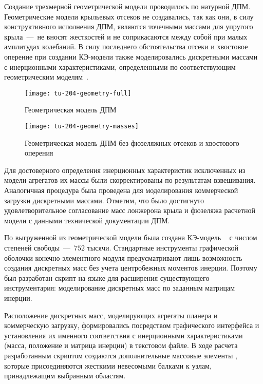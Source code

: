 Создание трехмерной геометрической модели  проводилось по натурной ДПМ. Геометрические модели крыльевых отсеков не создавались, так как они, в силу конструктивного исполнения ДПМ, являются точечными массами для упругого крыла~---~не вносят жесткостей и не соприкасаются между собой при малых амплитудах колебаний. В силу последнего обстоятельства отсеки и хвостовое оперение при создании КЭ-модели также моделировались дискретными массами с инерционными характеристиками, определенными по соответствующим геометрическим моделям~. 

\begin{figure}[!htb]
	\centerfloat
	\texttt{[image: tu-204-geometry-full]}
	\caption{Геометрическая модель ДПМ} \label{fig:tu-204-geometry-full}
\end{figure}

\begin{figure}[!htb]
	\centerfloat
	\texttt{[image: tu-204-geometry-masses]}
	\caption{Геометрическая модель ДПМ без фюзеляжных отсеков и хвостового оперения} \label{fig:tu-204-geometry-masses}
\end{figure}

Для достоверного определения инерционных характеристик исключенных из модели агрегатов их массы были скорректированы по результатам взвешивания. Аналогичная процедура была проведена для моделирования коммерческой загрузки дискретными массами. Отметим, что было достигнуто удовлетворительное согласование масс лонжерона крыла и фюзеляжа расчетной модели с данными технической документации ДПМ.

По выгруженной из  геометрической модели была создана КЭ-модель ~ с числом степеней свободы~---~$ 752 $ тысячи. Стандартные инструменты графической оболочки конечно-элементного модуля  предусматривают лишь возможность создания дискретных масс без учета центробежных моментов инерции. Поэтому был разработан скрипт на языке  для расширения существующего инструментария: моделирование дискретных масс по заданным матрицам инерции. 

Расположение дискретных масс, моделирующих агрегаты планера и коммерческую загрузку, формировались посредством графического интерфейса  и установления их именного соответствия с инерционными характеристиками (масса, положение и матрица инерции) в текстовом файле. В ходе расчета разработанным скриптом создаются дополнительные массовые элементы , которые присоединяются жесткими невесомыми балками к узлам, принадлежащим выбранным областям. 

